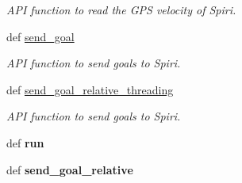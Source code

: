 \begin{DoxyCompactItemize}
\begin{DoxyCompactList}\small\item\em \-A\-P\-I function to read the \-G\-P\-S velocity of \-Spiri. \end{DoxyCompactList}\item 
def \hyperlink{classspiri__api_1_1get__state_1_1_staterobot_af6d1fe436714134bbd2fb78da0b09835}{send\-\_\-goal}
\begin{DoxyCompactList}\small\item\em \-A\-P\-I function to send goals to \-Spiri. \end{DoxyCompactList}\item 
def \hyperlink{classspiri__api_1_1get__state_1_1_staterobot_abc35e5157bb27bfc35bbfb4aee9df2e5}{send\-\_\-goal\-\_\-relative\-\_\-threading}
\begin{DoxyCompactList}\small\item\em \-A\-P\-I function to send goals to \-Spiri. \end{DoxyCompactList}\item 
\hypertarget{classspiri__api_1_1get__state_1_1_staterobot_aa856b1aa2607851f713326fa98aae62f}{def {\bfseries run}}\label{classspiri__api_1_1get__state_1_1_staterobot_aa856b1aa2607851f713326fa98aae62f}

\item 
\hypertarget{classspiri__api_1_1get__state_1_1_staterobot_a26b9c2b42ed90baf83a4b955c5fd8e1c}{def {\bfseries send\-\_\-goal\-\_\-relative}}\label{classspiri__api_1_1get__state_1_1_staterobot_a26b9c2b42ed90baf83a4b955c5fd8e1c}

\end{DoxyCompactItemize}
